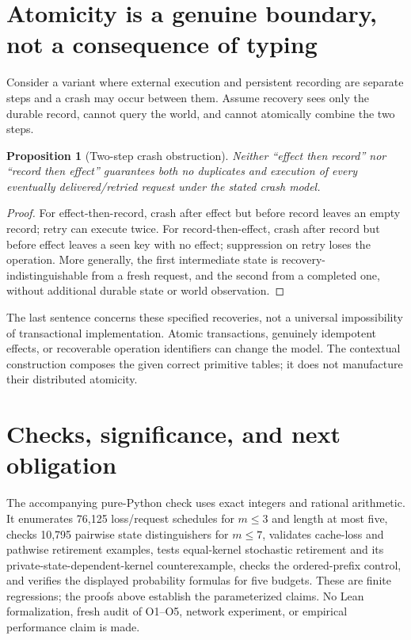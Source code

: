 \documentclass[11pt]{article}
\newtheorem{proposition}[theorem]{Proposition}
\begin{document}
\section{Atomicity is a genuine boundary, not a consequence of typing}
Consider a variant where external execution and persistent recording are separate steps and a crash may occur between them. Assume recovery sees only the durable record, cannot query the world, and cannot atomically combine the two steps.
\begin{proposition}[Two-step crash obstruction]
Neither ``effect then record'' nor ``record then effect'' guarantees both no duplicates and execution of every eventually delivered/retried request under the stated crash model.
\end{proposition}
\begin{proof}
For effect-then-record, crash after effect but before record leaves an empty record; retry can execute twice. For record-then-effect, crash after record but before effect leaves a seen key with no effect; suppression on retry loses the operation. More generally, the first intermediate state is recovery-indistinguishable from a fresh request, and the second from a completed one, without additional durable state or world observation.\end{proof}
The last sentence concerns these specified recoveries, not a universal impossibility of transactional implementation. Atomic transactions, genuinely idempotent effects, or recoverable operation identifiers can change the model. The contextual construction composes the given correct primitive tables; it does not manufacture their distributed atomicity.

\section{Checks, significance, and next obligation}
The accompanying pure-Python check uses exact integers and rational arithmetic. It enumerates 76,125 loss/request schedules for $m\le3$ and length at most five, checks 10,795 pairwise state distinguishers for $m\le7$, validates cache-loss and pathwise retirement examples, tests equal-kernel stochastic retirement and its private-state-dependent-kernel counterexample, checks the ordered-prefix control, and verifies the displayed probability formulas for five budgets. These are finite regressions; the proofs above establish the parameterized claims. No Lean formalization, fresh audit of O1--O5, network experiment, or empirical performance claim is made.
\end{document}
